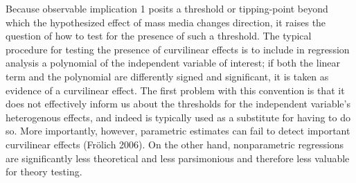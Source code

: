 \documentclass[11pt,article,oneside]{memoir}
\begin{document}
Because observable implication 1 posits a threshold or tipping-point
beyond which the hypothesized effect of mass media changes direction, it
raises the question of how to test for the presence of such a threshold.
The typical procedure for testing the presence of curvilinear effects is
to include in regression analysis a polynomial of the independent
variable of interest; if both the linear term and the polynomial are
differently signed and significant, it is taken as evidence of a
curvilinear effect. The first problem with this convention is that it
does not effectively inform us about the thresholds for the independent
variable's heterogenous effects, and indeed is typically used as a
substitute for having to do so. More importantly, however, parametric
estimates can fail to detect important curvilinear effects (Fr{ö}lich
2006). On the other hand, nonparametric regressions are significantly
less theoretical and less parsimonious and therefore less valuable for
theory testing.
\end{document}
